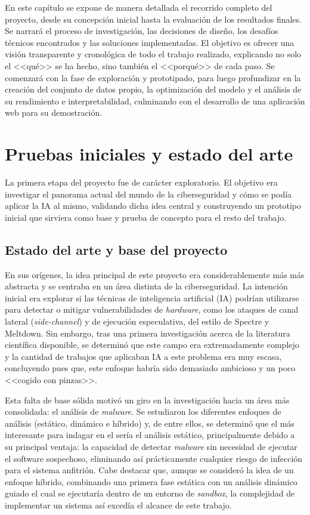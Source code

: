 
En este capítulo se expone de manera detallada el recorrido completo del proyecto, desde su concepción inicial hasta la evaluación de los resultados finales. Se narrará el proceso de investigación, las decisiones de diseño, los desafíos técnicos encontrados y las soluciones implementadas. El objetivo es ofrecer una visión transparente y cronológica de todo el trabajo realizado, explicando no solo el <<qué>> se ha hecho, sino también el <<porqué>> de cada paso. Se comenzará con la fase de exploración y prototipado, para luego profundizar en la creación del conjunto de datos propio, la optimización del modelo y el análisis de su rendimiento e interpretabilidad, culminando con el desarrollo de una aplicación web para su demostración.

\section{Pruebas iniciales y estado del arte}

La primera etapa del proyecto fue de carácter exploratorio. El objetivo era investigar el panorama actual del mundo de la ciberseguridad y cómo se podía aplicar la IA al mismo, validando dicha idea central y construyendo un prototipo inicial que sirviera como base y prueba de concepto para el resto del trabajo.

\subsection{Estado del arte y base del proyecto}

En sus orígenes, la idea principal de este proyecto era considerablemente más más abstracta y se centraba en un área distinta de la ciberseguridad. La intención inicial era explorar si las técnicas de inteligencia artificial (IA) podrían utilizarse para detectar o mitigar vulnerabilidades de \textit{hardware}, como los ataques de canal lateral (\textit{side-channel}) y de ejecución especulativa, del estilo de Spectre y Meltdown. Sin embargo, tras una primera investigación acerca de la literatura científica disponible, se determinó que este campo era extremadamente complejo y la cantidad de trabajos que aplicaban IA a este problema era muy escasa, concluyendo pues que, este enfoque habría sido demasiado ambicioso y un poco <<cogido con pinzas>>.

Esta falta de base sólida motivó un giro en la investigación hacia un área más consolidada: el análisis de \textit{malware}. Se estudiaron los diferentes enfoques de análisis (estático, dinámico e híbrido) y, de entre ellos, se determinó que el más interesante para indagar en el sería el análisis estático, principalmente debido a su principal ventaja: la capacidad de detectar \textit{malware} sin necesidad de ejecutar el software sospechoso, eliminando así prácticamente cualquier riesgo de infección para el sistema anfitrión. Cabe destacar que, aunque se consideró la idea de un enfoque híbrido, combinando una primera fase estática con un análisis dinámico guiado el cual se ejecutaría dentro de un entorno de \textit{sandbox}, la complejidad de implementar un sistema así excedía el alcance de este trabajo.

